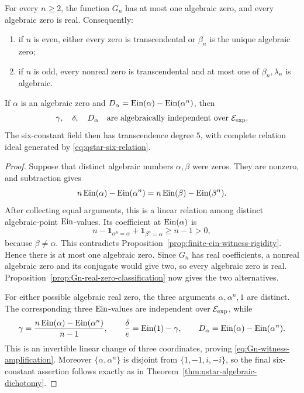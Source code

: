 \begin{theorem}
\label{thm:Gn-algebraic-zero-rigidity}
For every \(n\ge2\), the function \(G_n\) has at most one algebraic zero,
and every algebraic zero is real.  Consequently:
\begin{enumerate}[label=\textup{(\roman*)}]
 \item if \(n\) is even, either every zero is transcendental or
       \(\beta_n\) is the unique algebraic zero;
 \item if \(n\) is odd, every nonreal zero is transcendental and at most
       one of \(\beta_n,\lambda_n\) is algebraic.
\end{enumerate}
If \(\alpha\) is an algebraic zero and
\(D_\alpha=\operatorname{Ein}(\alpha)-\operatorname{Ein}(\alpha^n)\), then
\begin{equation}\label{eq:Gn-witness-amplification}
 \gamma,\quad\delta,\quad D_\alpha
 \quad\text{are algebraically independent over }\mathcal E_{\mathrm{exp}}.
\end{equation}
The six-constant field then has transcendence degree \(5\), with complete
relation ideal generated by \eqref{eq:qstar-six-relation}.
\end{theorem}

\begin{proof}
Suppose that distinct algebraic numbers \(\alpha,\beta\) were zeros.  They
are nonzero, and subtraction gives
\[
 n\operatorname{Ein}(\alpha)-\operatorname{Ein}(\alpha^n)
 =n\operatorname{Ein}(\beta)-\operatorname{Ein}(\beta^n).
\]
After collecting equal arguments, this is a linear relation among distinct
algebraic-point \(\operatorname{Ein}\)-values.  Its coefficient at
\(\operatorname{Ein}(\alpha)\) is
\[
 n-\mathbf1_{\alpha^n=\alpha}
   +\mathbf1_{\beta^n=\alpha}\ge n-1>0,
\]
because \(\beta\ne\alpha\).  This contradicts
Proposition~\ref{prop:finite-ein-witness-rigidity}.  Hence there is at most
one algebraic zero.  Since \(G_n\) has real coefficients, a nonreal
algebraic zero and its conjugate would give two, so every algebraic zero is
real.  Proposition~\ref{prop:Gn-real-zero-classification} now gives the two
alternatives.

For either possible algebraic real zero, the three arguments
\(\alpha,\alpha^n,1\) are distinct.  The corresponding three
\(\operatorname{Ein}\)-values are independent over \(\mathcal E_{\mathrm{exp}}\), while
\[
 \gamma=\frac{n\operatorname{Ein}(\alpha)-\operatorname{Ein}(\alpha^n)}{n-1},\qquad
 \frac\delta e=\operatorname{Ein}(1)-\gamma,\qquad
 D_\alpha=\operatorname{Ein}(\alpha)-\operatorname{Ein}(\alpha^n).
\]
This is an invertible linear change of three coordinates, proving
\eqref{eq:Gn-witness-amplification}.  Moreover
\(\{\alpha,\alpha^n\}\) is disjoint from \(\{1,-1,i,-i\}\), so the final
six-constant assertion follows exactly as in
Theorem~\ref{thm:qstar-algebraic-dichotomy}.
\end{proof}

